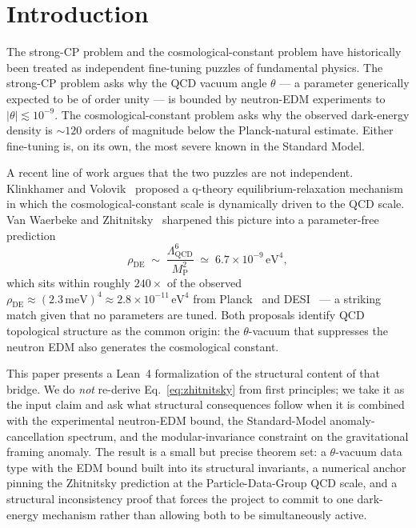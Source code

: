 \documentclass[twocolumn]{revtex4-2}
\newcommand{\rhoDE}{\rho_{\mathrm{DE}}}
\newcommand{\Lqcd}{\Lambda_{\mathrm{QCD}}}
\newcommand{\MP}{M_{\mathrm{P}}}
\begin{document}
\section{Introduction}
\label{sec:intro}

The strong-CP problem and the cosmological-constant problem have
historically been treated as independent fine-tuning puzzles of
fundamental physics. The strong-CP problem asks why the QCD vacuum angle
$\theta$ --- a parameter generically expected to be of order unity ---
is bounded by neutron-EDM experiments to $|\theta| \lesssim 10^{-9}$.
The cosmological-constant problem asks why the observed dark-energy
density is $\sim 120$ orders of magnitude below the Planck-natural
estimate. Either fine-tuning is, on its own, the most severe known in
the Standard Model.

A recent line of work argues that the two puzzles are not
independent. Klinkhamer and Volovik~\cite{KlinkhamerVolovik2010}
proposed a q-theory equilibrium-relaxation mechanism in which the
cosmological-constant scale is dynamically driven to the QCD scale.
Van Waerbeke and Zhitnitsky~\cite{VanWaerbeke2025} sharpened this
picture into a parameter-free prediction
\begin{equation}
  \rhoDE \;\sim\; \frac{\Lqcd^6}{\MP^2}
  \;\simeq\; 6.7 \times 10^{-9}\,\mathrm{eV}^4,
  \label{eq:zhitnitsky}
\end{equation}
which sits within roughly $240\times$ of the observed
$\rhoDE \approx (2.3\,\mathrm{meV})^4 \approx 2.8 \times 10^{-11}\,\mathrm{eV}^4$
from Planck~\cite{Planck2018} and DESI~\cite{DESI2024} --- a striking
match given that no parameters are tuned. Both proposals identify QCD topological structure as the
common origin: the $\theta$-vacuum that suppresses the neutron EDM also
generates the cosmological constant.

This paper presents a Lean~4 formalization of the structural content of
that bridge. We do \emph{not} re-derive Eq.~\eqref{eq:zhitnitsky} from
first principles; we take it as the input claim and ask what
structural consequences follow when it is combined with the
experimental neutron-EDM bound, the Standard-Model anomaly-cancellation
spectrum, and the modular-invariance constraint on the gravitational
framing anomaly. The result is a small but precise theorem set: a
$\theta$-vacuum data type with the EDM bound built into its
structural invariants, a numerical anchor pinning the Zhitnitsky
prediction at the Particle-Data-Group QCD scale, and a structural
inconsistency proof that forces the project to commit to one
dark-energy mechanism rather than allowing both to be simultaneously
active.
\end{document}
